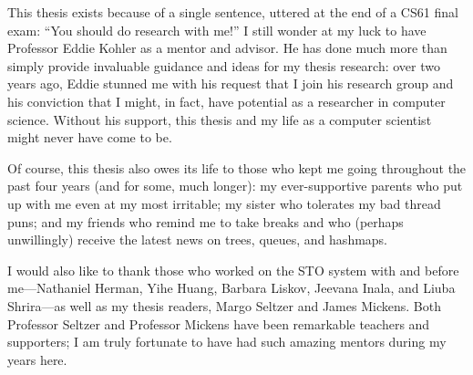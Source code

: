 This thesis exists because of a single sentence, uttered at the end of a CS61 final exam: ``You should do research with me!'' I still wonder at my luck to have Professor Eddie Kohler as a mentor and advisor. He has done much more than simply provide invaluable guidance and ideas for my thesis research: over two years ago, Eddie stunned me with his request that I join his research group and his conviction that I might, in fact, have potential as a researcher in computer science. Without his support, this thesis and my life as a computer scientist might never have come to be.

    Of course, this thesis also owes its life to those who kept me going throughout the past four years (and for some, much longer): my ever-supportive parents who put up with me even at my most irritable; my sister who tolerates my bad thread puns; and my friends who remind me to take breaks and who (perhaps unwillingly) receive the latest news on trees, queues, and hashmaps.

        I would also like to thank those who worked on the STO system with and before me---Nathaniel Herman, Yihe Huang, Barbara Liskov, Jeevana Inala, and Liuba Shrira---as well as my thesis readers, Margo Seltzer and James Mickens. Both Professor Seltzer and Professor Mickens have been remarkable teachers and supporters; I am truly fortunate to have had such amazing mentors during my years here.

